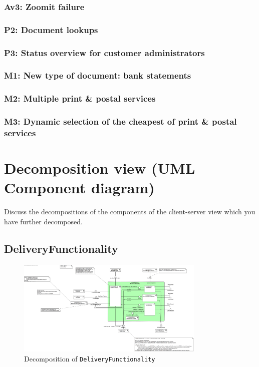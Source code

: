 \documentclass[a4paper,10pt]{article}
\begin{document}
\subsubsection{Av3\@: Zoomit failure}\label{subsubsec:Av3}

\subsubsection{P2\@: Document lookups}\label{subsubsec:P2}

\subsubsection{P3\@: Status overview for customer administrators}\label{subsubsec:P3}

\subsubsection{M1\@: New type of document: bank statements}\label{subsubsec:M1}

\subsubsection{M2\@: Multiple print \& postal services}\label{subsubsec:M2}

\subsubsection{M3\@: Dynamic selection of the cheapest of print \& postal services}\label{subsubsec:M3}

\section{Decomposition view (UML Component diagram)}\label{sec:decomposition}
Discuss the decompositions of the components of the client-server view which
you have further decomposed.

\subsection{DeliveryFunctionality}\label{subsec:decomp-DeliveryFunctionality}
\begin{figure}[!htp]
	\centering
	\includegraphics[width=0.8\textwidth]{DeliveryFunctionality.png}
	\caption{Decomposition of \texttt{DeliveryFunctionality}}
	\label{fig:decomp-DeliveryFunctionality}
\end{figure}
\FloatBarrier
\end{document}
